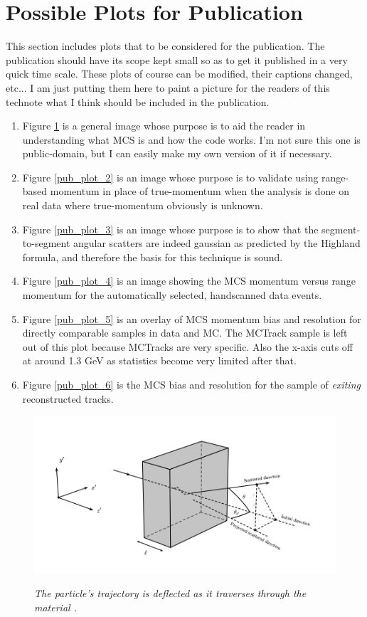 \section{Possible Plots for Publication}\label{publicplots_section}
This section includes plots that to be considered for the publication. The publication should have its scope kept small so as to get it published in a very quick time scale. These plots of course can be modified, their captions changed, etc... I am just putting them here to paint a picture for the readers of this technote what I think should be included in the publication.
\begin{enumerate}
	\item Figure \ref{pub_plot_1} is a general image whose purpose is to aid the reader in understanding what MCS is and how the code works. I'm not sure this one is public-domain, but I can easily make my own version of it if necessary.
	\item Figure \ref{pub_plot_2} is an image whose purpose is to validate using range-based momentum in place of true-momentum when the analysis is done on real data where true-momentum obviously is unknown.
	\item Figure \ref{pub_plot_3} is an image whose purpose is to show that the segment-to-segment angular scatters are indeed gaussian as predicted by the Highland formula, and therefore the basis for this technique is sound.
	\item Figure \ref{pub_plot_4} is an image showing the MCS momentum versus range momentum for the automatically selected, handscanned data events.
	\item Figure \ref{pub_plot_5} is an overlay of MCS momentum bias and resolution for directly comparable samples in data and MC. The {\sc MCTrack} sample is left out of this plot because {\sc MCTracks} are very {\ub} specific. Also the x-axis cuts off at around 1.3 GeV as statistics become very limited after that.
	\item Figure \ref{pub_plot_6} is the MCS bias and resolution for the sample of \textit{exiting} reconstructed tracks.
\end{enumerate}

\begin{figure}[ht!]
\centering
	\includegraphics[width=0.5\linewidth]{Figures/static_figs/mcs_nocap.png} \\
\caption{\textit{The particle's trajectory is deflected as it traverses through the material \cite{leonidas1}.}}\label{pub_plot_1}
\end{figure}

